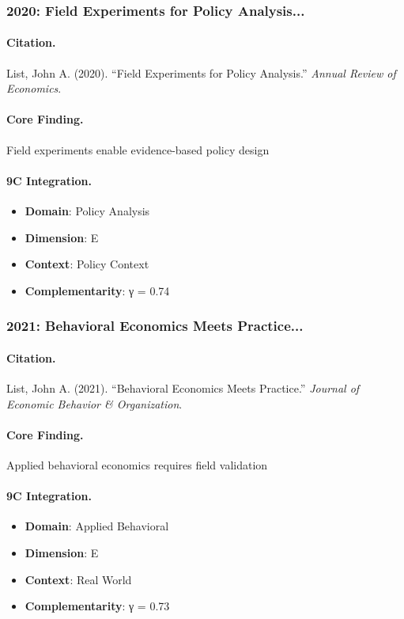 \subsubsection{2020: Field Experiments for Policy Analysis...}

\paragraph{Citation.}
List, John A. (2020). ``Field Experiments for Policy Analysis.''
\textit{Annual Review of Economics}.

\paragraph{Core Finding.}
Field experiments enable evidence-based policy design

\paragraph{9C Integration.}
\begin{itemize}[nosep]
  \item \textbf{Domain}: Policy Analysis
  \item \textbf{Dimension}: E
  \item \textbf{Context}: Policy Context
  \item \textbf{Complementarity}: γ = 0.74
\end{itemize}


\subsubsection{2021: Behavioral Economics Meets Practice...}

\paragraph{Citation.}
List, John A. (2021). ``Behavioral Economics Meets Practice.''
\textit{Journal of Economic Behavior & Organization}.

\paragraph{Core Finding.}
Applied behavioral economics requires field validation

\paragraph{9C Integration.}
\begin{itemize}[nosep]
  \item \textbf{Domain}: Applied Behavioral
  \item \textbf{Dimension}: E
  \item \textbf{Context}: Real World
  \item \textbf{Complementarity}: γ = 0.73
\end{itemize}



